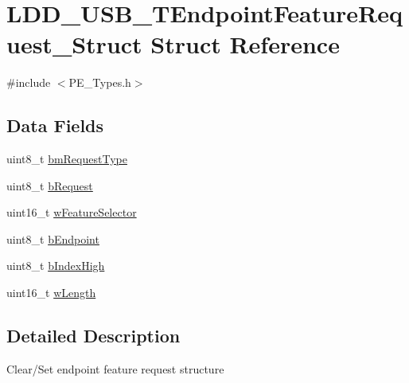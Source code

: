\hypertarget{struct_l_d_d___u_s_b___t_endpoint_feature_request___struct}{\section{L\-D\-D\-\_\-\-U\-S\-B\-\_\-\-T\-Endpoint\-Feature\-Request\-\_\-\-Struct Struct Reference}
\label{struct_l_d_d___u_s_b___t_endpoint_feature_request___struct}
}


{\ttfamily \#include $<$P\-E\-\_\-\-Types.\-h$>$}

\subsection*{Data Fields}
\begin{DoxyCompactItemize}
\item 
uint8\-\_\-t \hyperlink{struct_l_d_d___u_s_b___t_endpoint_feature_request___struct_adc137c604066ff6d3c614dbaa2cb225f}{bm\-Request\-Type}
\item 
uint8\-\_\-t \hyperlink{struct_l_d_d___u_s_b___t_endpoint_feature_request___struct_acd2dcd4a8762d22f84cfe3b9d9607a25}{b\-Request}
\item 
uint16\-\_\-t \hyperlink{struct_l_d_d___u_s_b___t_endpoint_feature_request___struct_aa026e7ce420430dc65a72dcc10337553}{w\-Feature\-Selector}
\item 
uint8\-\_\-t \hyperlink{struct_l_d_d___u_s_b___t_endpoint_feature_request___struct_a411af4337f39b9553d65d73bee6af5ec}{b\-Endpoint}
\item 
uint8\-\_\-t \hyperlink{struct_l_d_d___u_s_b___t_endpoint_feature_request___struct_aeec172fdf61100889cd7f70958283f48}{b\-Index\-High}
\item 
uint16\-\_\-t \hyperlink{struct_l_d_d___u_s_b___t_endpoint_feature_request___struct_aec7dc034039bc4deb5c811afac0686a5}{w\-Length}
\end{DoxyCompactItemize}


\subsection{Detailed Description}
Clear/\-Set endpoint feature request structure 


